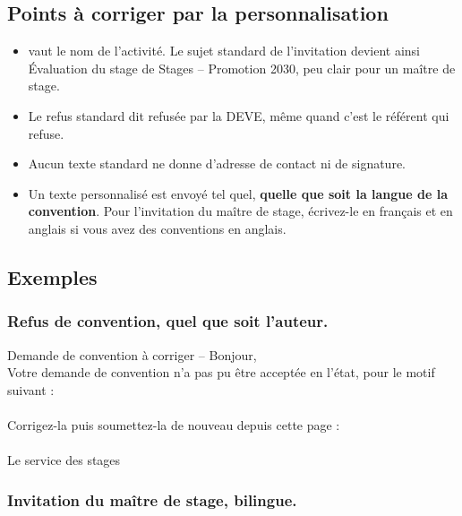 \documentclass[11pt,a4paper]{article}
\begin{document}
\subsection{Points à corriger par la personnalisation}

\begin{itemize}
  \item {} vaut le nom de l'activité. Le sujet standard de
        l'invitation devient ainsi \og Évaluation du stage de Stages --
        Promotion 2030\fg{}, peu clair pour un maître de stage.
  \item Le refus standard dit \og refusée par la DEVE\fg{}, même quand c'est le
        référent qui refuse.
  \item Aucun texte standard ne donne d'adresse de contact ni de signature.
  \item Un texte personnalisé est envoyé tel quel, \textbf{quelle que soit la
        langue de la convention}. Pour l'invitation du maître de stage, écrivez-le
        en français et en anglais si vous avez des conventions en anglais.
\end{itemize}

\subsection{Exemples}

\subsubsection*{Refus de convention, quel que soit l'auteur.}

\begin{courriel}{Demande de convention à corriger -- }
Bonjour,\\[4pt]
Votre demande de convention n'a pas pu être acceptée en l'état, pour le motif
suivant :\\[4pt]
\\[4pt]
Corrigez-la puis soumettez-la de nouveau depuis cette page :\\
\\[4pt]
Le service des stages
\end{courriel}


\subsubsection*{Invitation du maître de stage, bilingue.}
\end{document}
